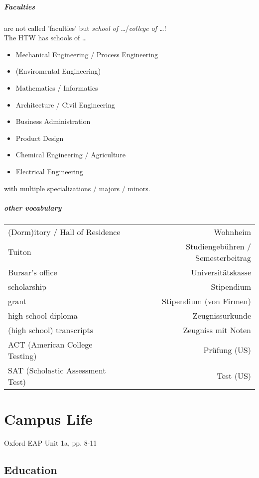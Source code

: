 \paragraph{Faculties} are not called 'faculties' but \emph{school of …}/\emph{college of …}!\\
The HTW has schools of …
\begin{itemize}
\item Mechanical Engineering / Process Engineering
\item (Enviromental Engineering)
\item Mathematics / Informatics
\item Architecture / Civil Engineering
\item Business Administration
\item Product Design
\item Chemical Engineering / Agriculture
\item Electrical Engineering
\end{itemize}
with multiple specializations / majors / minors.

\paragraph{other vocabulary} \parskp
\begin{tabular}{l	r}
(Dorm)itory / Hall of Residence & Wohnheim\\
Tuiton & Studiengebühren / Semesterbeitrag\\
Bursar's office & Universitätskasse\\
scholarship & Stipendium\\
grant & Stipendium (von Firmen)\\
high school diploma & Zeugnissurkunde \\
(high school) transcripts & Zeugniss mit Noten\\
ACT (American College Testing) & Prüfung (US)\\
SAT (Scholastic Assessment Test) & Test (US)
\end{tabular}
\chapter{Campus Life}
Oxford EAP Unit 1a, pp. 8-11
\section{Education}

